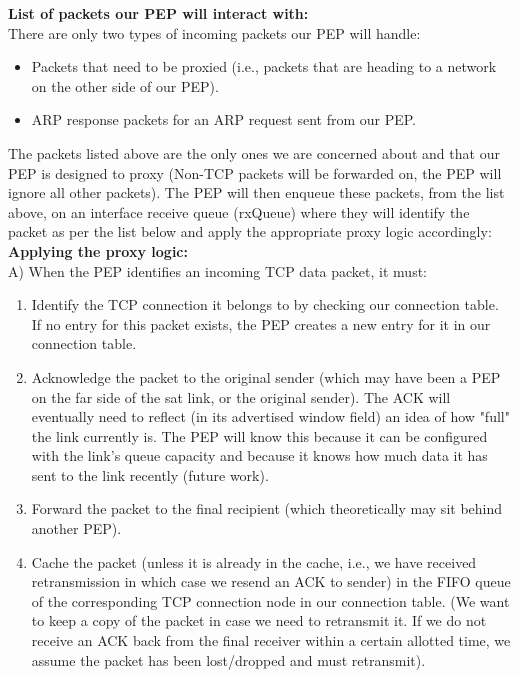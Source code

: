 \noindent \textbf{List of packets our PEP will interact with:} \\

There are only two types of incoming packets our PEP will handle:\\
\begin{itemize}
\item Packets that need to be proxied (i.e., packets that are heading to a network on the other side of our PEP).
\item ARP response packets for an ARP request sent from our PEP. \\
\end{itemize}

The packets listed above are the only ones we are concerned about and that our PEP is designed to proxy (Non-TCP packets will be forwarded on, the PEP will ignore all other packets). The PEP will then enqueue these packets, from the list above, on an interface receive queue (rxQueue) where they will identify the packet as per the list below and apply the appropriate proxy logic accordingly:\\

\noindent \textbf{Applying the proxy logic:} \\

\noindent A) When the PEP identifies an incoming TCP data packet, it must:\\ 

\begin{enumerate} 
\item Identify the TCP connection it belongs to by checking our connection table. If no entry for this packet exists, the PEP creates a new entry for it in our connection table. \\
\item Acknowledge the packet to the original sender (which may have been a PEP on the far side of the sat link, or the original sender). The ACK will eventually need to reflect (in its advertised window field) an idea of how "full" the link currently is. The PEP will know this because it can be configured with the link's queue capacity and because it knows how much data it has sent to the link recently (future work). \\
\item Forward the packet to the final recipient (which theoretically may sit behind another PEP). \\
\item Cache the packet (unless it is already in the cache, i.e., we have received retransmission in which case we resend an ACK to sender) in the FIFO queue of the corresponding TCP connection node in our connection table. (We want to keep a copy of the packet in case we need to retransmit it. If we do not receive an ACK back from the final receiver within a certain allotted time, we assume the packet has been lost/dropped and must retransmit).\\
\end{enumerate}

